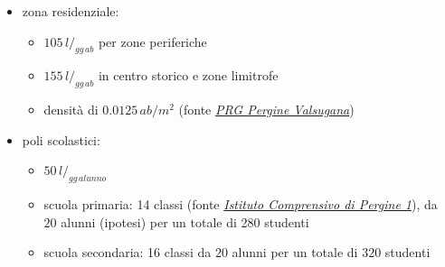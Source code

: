 \documentclass{beamer}
\begin{document}
{\begin{frame}[allowframebreaks]
\begin{columns}
\begin{column}{.45\textwidth}
  \end{column}
%
  \begin{column}{0.55\textwidth}
   \begin{itemize}
		\item zona residenziale:
    \begin{itemize}
     \item $105\,l/_{gg\,ab}$ per zone periferiche
     \item $155\,l/_{gg\,ab}$ in centro storico e zone limitrofe
     \item densità di $0.0125\,ab/m^2$ (fonte \href{http://cartografia.comune.pergine.tn.it/PRG_Vigente/documenti/main.html}{\emph{PRG Pergine Valsugana}})
    \end{itemize}
    \item poli scolastici: 
    \begin{itemize}
     \item $50\,l/_{gg\,alunno}$
     \item scuola primaria: 14 classi (fonte \href{http://www.icpergine1.it/}{\emph{Istituto Comprensivo di Pergine 1}}), da $20$ alunni (ipotesi) per un totale di 280 studenti
     \item scuola secondaria: 16 classi da $20$ alunni per un totale di $320$ studenti
    \end{itemize}
   \end{itemize}
  \end{column}
 \end{columns}
\framebreak
%
\begin{columns}
  \begin{column}{.45\textwidth}
   \begin{figure}
    \centering
    \\[1.5ex]
    \\[1.5ex]

\end{figure}
\end{column}
\end{columns}
\end{frame}}
\end{document}
